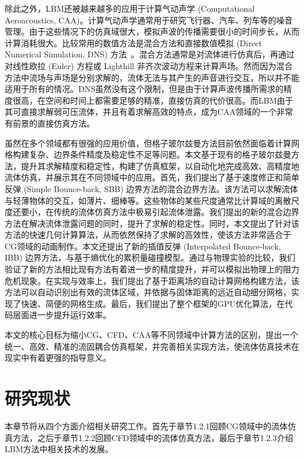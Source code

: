 除此之外，LBM还被越来越多的应用于计算气动声学 (Computational Aeroacoustics, CAA)。计算气动声学通常用于研究飞行器、汽车、列车等的噪音管理。由于这些情况下的仿真域很大，模拟声波的传播需要很小的时间步长，从而计算消耗很大。比较常用的数值方法是混合方法和直接数值模拟 (Direct Numerical Simulation, DNS) 方法~\cite{doi:10.2514/1.15993}。混合方法通常是对流体进行仿真后，再通过对线性欧拉 (Euler) 方程\cite{doi:10.1080/10618560410001673498,Bogey:2002:1610-1928:463,doi:10.2514/1.18933}或 Lighthill 非齐次波动方程\cite{doi:10.1098/rspa.1952.0060}来计算声场。然而因为混合方法中流场与声场是分别求解的，流体无法与其产生的声音进行交互，所以并不能适用于所有的情况。DNS虽然没有这个限制，但是由于计算声波传播所需求的精度很高，在空间和时间上都需要足够的精准，直接仿真的代价很高。而LBM由于其可直接求解弱可压流体，并且有着求解高效的特点，成为CAA领域的一个非常有前景的直接仿真方法。

虽然在多个领域都有很强的应用价值，但格子玻尔兹曼方法目前依然面临着计算网格构建复杂、边界条件精度及稳定性不足等问题。本文基于现有的格子玻尔兹曼方法，提升其求解精度和稳定性，构建了仿真框架，以自动化地完成高效、高精度地流体仿真，并展示其在不同领域中的应用。首先，我们提出了基于速度修正和简单反弹 (Simple Bounce-back, SBB) 边界方法的混合边界方法。该方法可以求解流体与轻薄物体的交互，如薄片、细棒等。这些物体的某些尺度通常比计算域的离散尺度还要小，在传统的流体仿真方法中极易引起流体泄露。我们提出的新的混合边界方法在解决流体泄露问题的同时，提升了求解的稳定性。同时，本文提出了针对该方法的快速几何计算算法，从而依然保持了求解的高效性，使该方法非常适合于CG领域的动画制作。本文还提出了新的插值反弹 (Interpolated Bounce-back, IBB) 边界方法，与基于熵优化的累积量碰撞模型。通过与物理实验的比较，我们验证了新的方法相比现有方法有着进一步的精度提升，并可以模拟出物理上的阻力危机现象。在实现与效率上，我们提出了基于距离场的自动计算网格构建方法，该方法可以自动识别出有效的流体区域，并依据与固体距离的远近自动细分网格，实现了快速、简便的网格生成。最后，我们提出了整个框架的GPU优化算法，在代码层面进一步提升运行效率。

本文的核心目标为缩小CG、CFD、CAA等不同领域中计算方法的区别，提出一个统一、高效、精准的流固耦合仿真框架，并完善相关实现方法，使流体仿真技术在现实中有着更强的指导意义。


\section{研究现状}
本章节将从四个方面介绍相关研究工作。首先于章节1.2.1回顾CG领域中的流体仿真方法，之后于章节1.2.2回顾CFD领域中的流体仿真方法，最后于章节1.2.3介绍LBM方法中相关技术的发展。

